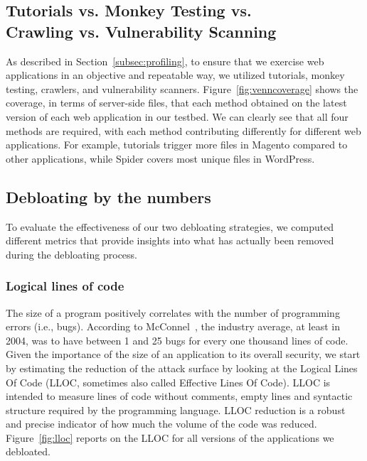 \subsection{Tutorials vs. Monkey Testing vs. \\Crawling vs. Vulnerability Scanning}
As described in Section~\ref{subsec:profiling}, to ensure that we exercise web applications in an objective and repeatable way, we utilized tutorials, monkey testing, crawlers, and vulnerability scanners. Figure~\ref{fig:venncoverage} shows the coverage, in terms of server-side files, that each method obtained on the latest version of each web application in our testbed. We can clearly see that all four methods are required, with each method contributing differently for different web applications.
For example, tutorials trigger more files in Magento compared to other applications, while Spider covers most unique files in WordPress.


\subsection{Debloating by the numbers}
To evaluate the effectiveness of our two debloating strategies, we computed different metrics that provide
insights into what has actually been removed during the debloating process.


\subsubsection{Logical lines of code}
\label{subsubsec:lloc}
The size of a program positively correlates with the number of programming errors (i.e., bugs). According to McConnel~\cite{mcconnell2004code}, the industry average, at least in 2004, was to have between 1 and 25 bugs for every one thousand lines of code. Given the importance of the size of an application to its overall security, we start by estimating the reduction of the attack surface by looking at the
Logical Lines Of Code (LLOC, sometimes also called Effective Lines Of
Code). LLOC is intended to measure lines of code without comments, empty
lines and syntactic structure required by the programming language. LLOC
reduction is a robust and precise indicator of how much the volume of
the code was reduced.
Figure~\ref{fig:lloc} reports on the LLOC for all versions of the applications
we debloated.


